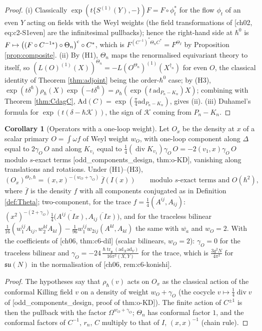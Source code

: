 \documentclass[11pt]{article}
\theoremstyle{definition}
\newtheorem{corollary}[definition]{Corollary}
\begin{document}
\begin{proof}
(i) Classically $\exp(t\{S^{(1)}(Y),-\})F=F\circ\phi_t^*$ for the flow $\phi_t$ of an even $Y$ acting on fields with the Weyl weights (the field transformations of [ch02, eq:c2-S1even] are the infinitesimal pullbacks); hence the right-hand side at $\hbar^0$ is $F\mapsto\big((F\circ C^{-1*})\circ\Theta_n\big)^{\rm c}\circ C^*$, which is $F^{(C^{-1})^*\Theta_nC^*}=F^{\Theta_I}$ by Proposition \ref{prop:composite}. (ii) By (H1), $\Theta_n$ maps the renormalised equivariant theory to itself, so $(L(O)^{(1)}(X))^{\Theta_n}=-L(O^{\Theta_n})^{(1)}(X^{\dagger_n})$ for even $O$, the classical identity of Theorem \ref{thm:adjoint} being the order-$\hbar^0$ case; by (H3), $\exp(t\delta^\hbar)\rho_\hbar(X)\exp(-t\delta^\hbar)=\rho_\hbar(\exp(t\,\mathrm{ad}_{P_n-K_n})X)$; combining with Theorem \ref{thm:CdagC}, $\mathrm{Ad}(C)=\exp(\frac\pi4\mathrm{ad}_{P_n-K_n})$, gives (ii). (iii) Duhamel's formula for $\exp(t(\delta-\hbar\mathcal K))$, the sign of $\mathcal K$ coming from $P_n-K_n$.
\end{proof}

\begin{corollary}[Operators with a one-loop weight]
\label{cor:weight}
Let $O_x$ be the density at $x$ of a scalar primary $O=\int\omega f$ of Weyl weight $w_O$, with one-loop component along $\Delta$ equal to $2\gamma_O\,O$ and along $K_{v_1}$ equal to $\frac14(\operatorname{div}K_{v_1})\gamma_O\,O=-2(v_1,x)\gamma_O\,O$ modulo $s$-exact terms [odd\_components\_design, thm:o-KD], vanishing along translations and rotations. Under (H1)--(H3),
\[
(O_x)^{\Theta_I,\hbar}=(x,x)^{-(w_O+\gamma_O)}\,\overline{f}(I(x))\qquad\text{modulo }s\text{-exact terms and }O(\hbar^2),
\]
where $\overline f$ is the density $f$ with all components conjugated as in Definition \ref{def:Theta}; two-component, for the trace $f=\frac14(A^{ij},A_{ij})$: $(x^2)^{-(2+\gamma_O)}\frac14\big(\overline{A^{ij}(Ix)},\overline{A_{ij}(Ix)}\big)$, and for the traceless bilinear $\frac1{16}(w_1^{ij}A_{ij},w_2^{kl}A_{kl})-\frac1{96}w_1^{ij}w_{2ij}(A^{kl},A_{kl})$ the same with $\overline{w_a}$ and $w_O=2$. With the coefficients of [ch06, thm:c6-dil] (scalar bilinears, $w_O=2$): $\gamma_O=0$ for the traceless bilinear and $\gamma_O=-24\,\frac{\hbar\operatorname{tr}_{\mathfrak g}(\mathrm{ad}_X\mathrm{ad}_Y)}{16\pi^2(X,Y)}$ for the trace, which is $\frac{3g^2N}{4\pi^2}$ for $\mathfrak{su}(N)$ in the normalisation of [ch06, rem:c6-konishi].
\end{corollary}

\begin{proof}
The hypotheses say that $\rho_\hbar(v)$ acts on $O_x$ as the classical action of the conformal Killing field $v$ on a density of weight $w_O+\gamma_O$ (the cocycle $v\mapsto\frac14\operatorname{div}v$ of [odd\_components\_design, proof of thm:o-KD]). The finite action of $C^{\pm1}$ is then the pullback with the factor $\Omega^{w_O+\gamma_O}$; $\Theta_n$ has conformal factor $1$, and the conformal factors of $C^{-1}$, $r_n$, $C$ multiply to that of $I$, $(x,x)^{-1}$ (chain rule).
\end{proof}
\end{document}
